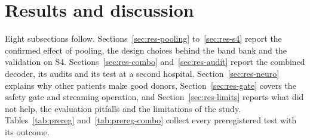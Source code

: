 \documentclass[pdflatex,sn-mathphys-num]{sn-jnl}
\begin{document}
\section{Results and discussion}\label{sec:results}

Eight subsections follow. Sections~\ref{sec:res-pooling} to~\ref{sec:res-s4} report the confirmed effect of pooling, the design choices behind the band bank and the validation on S4. Sections~\ref{sec:res-combo} and~\ref{sec:res-audit} report the combined decoder, its audits and its test at a second hospital. Section~\ref{sec:res-neuro} explains why other patients make good donors, Section~\ref{sec:res-gate} covers the safety gate and streaming operation, and Section~\ref{sec:res-limits} reports what did not help, the evaluation pitfalls and the limitations of the study. Tables~\ref{tab:prereg} and~\ref{tab:prereg-combo} collect every preregistered test with its outcome.
\end{document}
